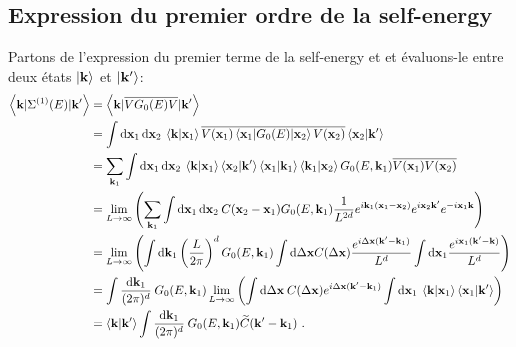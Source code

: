\subsection{Expression du premier ordre de la self-energy}
Partons de l'expression du premier terme de la self-energy et et évaluons-le entre deux états $\left| \mathbf{k} \right\rangle$ et $\left| \mathbf{k}' \right\rangle$:
\begin{align}
\left\langle \mathbf{k} | \Sigma^{(1)}(E) | \mathbf{k}' \right\rangle &= \left\langle \mathbf{k} | \overline{V G_0(E) V} | \mathbf{k}' \right\rangle \\
&= \int{ \mathop{}\mathopen{}\mathrm{d}\mathbf{x}_{\mathrm{1}} \mathop{}\mathopen{}\mathrm{d}\mathbf{x}_{\mathrm{2}} \: \left\langle \mathbf{k} | \mathbf{x}_{\mathrm{1}} \right\rangle \overline{V(\mathbf{x}_{\mathrm{1}}) \left\langle \mathbf{x}_{\mathrm{1}} | G_0(E) | \mathbf{x}_{\mathrm{2}}\right\rangle V(\mathbf{x}_{\mathrm{2}}) } \left\langle \mathbf{x}_{\mathrm{2}} |\mathbf{k}' \right\rangle} \\
&= \sum_{\mathbf{k}_{\mathrm{1}}}{\int{\mathop{}\mathopen{}\mathrm{d}\mathbf{x}_{\mathrm{1}} \mathop{}\mathopen{}\mathrm{d}\mathbf{x}_{\mathrm{2}} \: \left\langle \mathbf{k} |\mathbf{x}_{\mathrm{1}} \right\rangle \left\langle \mathbf{x}_{\mathrm{2}} | \mathbf{k}' \right\rangle \left\langle \mathbf{x}_{\mathrm{1}} | \mathbf{k}_{\mathrm{1}} \right\rangle \left\langle \mathbf{k}_{\mathrm{1}} | \mathbf{x}_{\mathrm{2}} \right\rangle G_0(E,\mathbf{k}_{\mathrm{1}})\overline{V(\mathbf{x}_{\mathrm{1}})V(\mathbf{x}_{\mathrm{2}})}}} \\
&= \lim\limits_{L\rightarrow\infty} \left( \sum_{\mathbf{k}_{\mathrm{1}}}{\int{\mathop{}\mathopen{}\mathrm{d}\mathbf{x}_{\mathrm{1}}\mathop{}\mathopen{}\mathrm{d}\mathbf{x}_{\mathrm{2}}\: C(\mathbf{x}_{\mathrm{2}}-\mathbf{x}_{\mathrm{1}}) G_0(E,\mathbf{k}_{\mathrm{1}}) \frac{1}{L^{2d}} e^{i \mathbf{k}_{\mathrm{1}}(\mathbf{x}_{\mathrm{1}}-\mathbf{x}_{\mathrm{2}})} e^{i \mathbf{x}_{\mathrm{2}} \mathbf{k}'} e^{-i \mathbf{x}_{\mathrm{1}} \mathbf{k}} }} \right) \\
&= \lim\limits_{L\rightarrow\infty} \left( \int{\mathop{}\mathopen{}\mathrm{d}\mathbf{k}_{\mathrm{1}}  \left(\frac{L}{2\pi}\right)^d G_0(E,\mathbf{k}_{\mathrm{1}}) \int{\mathop{}\mathopen{}\mathrm{d}\Delta\mathbf{x}  C(\Delta\mathbf{x}) \frac{e^{i \Delta\mathbf{x}(\mathbf{k}'-\mathbf{k}_{\mathrm{1}})}}{L^d}} \int{\mathop{}\mathopen{}\mathrm{d}\mathbf{x}_{\mathrm{1}} \frac{e^{i \mathbf{x}_{\mathrm{1}}(\mathbf{k}'-\mathbf{k})}}{L^d}} } \right) \\
&=\int{\frac{\mathop{}\mathopen{}\mathrm{d}\mathbf{k}_{\mathrm{1}}}{(2\pi)^d} \: G_0(E,\mathbf{k}_{\mathrm{1}}) \lim\limits_{L\rightarrow\infty}\left( \int{\mathop{}\mathopen{}\mathrm{d}\Delta\mathbf{x} \: C(\Delta\mathbf{x}) e^{i\Delta\mathbf{x}(\mathbf{k}'-\mathbf{k}_{\mathrm{1}})}} \int{\mathop{}\mathopen{}\mathrm{d}\mathbf{x}_{\mathrm{1}} \: \left\langle \mathbf{k} | \mathbf{x}_{\mathrm{1}}\right\rangle \left\langle \mathbf{x}_{\mathrm{1}} | \mathbf{k}' \right\rangle } \right)} \\
&= \left\langle \mathbf{k} | \mathbf{k}' \right\rangle \int{\frac{\mathop{}\mathopen{}\mathrm{d}\mathbf{k}_{\mathrm{1}}}{(2\pi)^d} \: G_0(E,\mathbf{k}_{\mathrm{1}}) \widetilde{C}(\mathbf{k}'-\mathbf{k}_{\mathrm{1}})} \text{ .}
\end{align}
